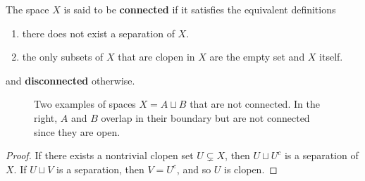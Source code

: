   \begin{definition}[Connected]
    The space $X$ is said to be \textbf{connected} if it satisfies the equivalent definitions 
    \begin{enumerate}
      \item there does not exist a separation of $X$. 
      \item the only subsets of $X$ that are clopen in $X$ are the empty set and $X$ itself. 
    \end{enumerate}
    and \textbf{disconnected} otherwise. 

    \begin{figure}[H]
      \centering 
      \caption{Two examples of spaces $X = A \sqcup B$ that are not connected. In the right, $A$ and $B$ overlap in their boundary but are not connected since they are open. } 
      \label{fig:separation}
    \end{figure}
  \end{definition}
  \begin{proof}
    If there exists a nontrivial clopen set $U \subsetneq X$, then $U \sqcup U^c$ is a separation of $X$. If $U \sqcup V$ is a separation, then $V = U^c$, and so $U$ is clopen. 
  \end{proof} 

